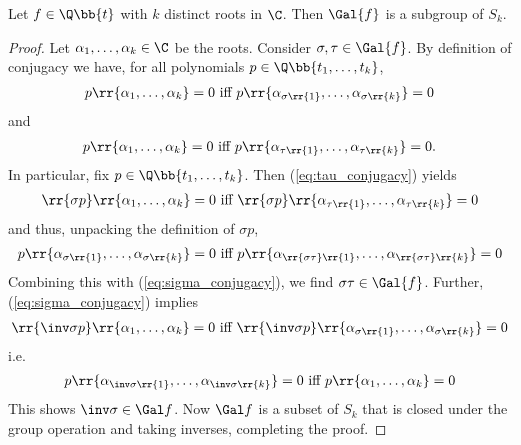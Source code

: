 \documentclass{article}
\begin{document}
\begin{claim*}[ii]
  Let $f\in\Q\bb{t}$ with $k$ distinct roots in $\C$. Then $\Gal{f}$ is a subgroup of $S_k$.
  \begin{proof}
    Let $\alpha_1,\ldots,\alpha_k\in\C$ be the roots. Consider $\sigma,\tau\in\Gal{f}$.
    By definition of conjugacy we have, for all polynomials $p\in\Q\bb{t_1,\ldots,t_k}$,
    \begin{align}
      \label{eq:sigma_conjugacy}
      p\rr{\alpha_1,\ldots,\alpha_k} = 0 \text{ iff }
      p\rr{\alpha_{\sigma\rr{1}},\ldots,\alpha_{\sigma\rr{k}}} = 0
    \end{align}
    and
    \begin{align}
      \label{eq:tau_conjugacy}
      p\rr{\alpha_1,\ldots,\alpha_k} = 0 \text{ iff }
      p\rr{\alpha_{\tau\rr{1}},\ldots,\alpha_{\tau\rr{k}}} = 0.
    \end{align}
    In particular, fix $p\in\Q\bb{t_1,\ldots,t_k}$. Then (\ref{eq:tau_conjugacy}) yields
    \begin{align*}
      \rr{\sigma p}\rr{\alpha_1,\ldots,\alpha_k} = 0 \text{ iff }
      \rr{\sigma p}\rr{\alpha_{\tau\rr{1}},\ldots,\alpha_{\tau\rr{k}}} = 0
    \end{align*}
    and thus, unpacking the definition of $\sigma p$,
    \begin{align*}
      p\rr{\alpha_{\sigma\rr{1}},\ldots,\alpha_{\sigma\rr{k}}} = 0 \text{ iff }
      p\rr{\alpha_{\rr{\sigma\tau}\rr{1}},\ldots,\alpha_{\rr{\sigma\tau}\rr{k}}} = 0
    \end{align*}
    Combining this with (\ref{eq:sigma_conjugacy}), we find $\sigma\tau\in\Gal{f}$.
    Further, (\ref{eq:sigma_conjugacy}) implies
    \begin{align*}
      \rr{\inv\sigma p}\rr{\alpha_1,\ldots,\alpha_k} = 0 \text{ iff }
      \rr{\inv\sigma p}\rr{\alpha_{\sigma\rr{1}},\ldots,\alpha_{\sigma\rr{k}}} = 0
    \end{align*}
    i.e.
    \begin{align*}
      p\rr{\alpha_{\inv\sigma\rr{1}},\ldots,\alpha_{\inv\sigma\rr{k}}} = 0 \text{ iff }
      p\rr{\alpha_1,\ldots,\alpha_k} = 0
    \end{align*}
    This shows $\inv\sigma\in\Gal f$. Now $\Gal f$ is a subset of $S_k$ that is closed
    under the group operation and taking inverses, completing the proof.
  \end{proof}
\end{claim*}
\end{document}
